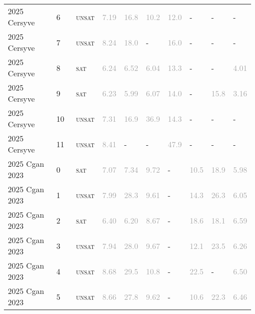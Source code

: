 \begin{center}
{\begin{longtable}{@{}llllllllll@{}}
2025 Cersyve & 6 & ~\textsc{unsat} & \textcolor{darkgray}{7.19} & \textcolor{darkgray}{16.8} & \textcolor{darkgray}{10.2} & \textcolor{darkgray}{12.0} & - & - & - \\
2025 Cersyve & 7 & ~\textsc{unsat} & \textcolor{darkgray}{8.24} & \textcolor{darkgray}{18.0} & - & \textcolor{darkgray}{16.0} & - & - & - \\
2025 Cersyve & 8 & ~\textsc{sat} & \textcolor{darkgray}{6.24} & \textcolor{darkgray}{6.52} & \textcolor{darkgray}{6.04} & \textcolor{darkgray}{13.3} & - & - & \textcolor{darkgray}{4.01} \\
2025 Cersyve & 9 & ~\textsc{sat} & \textcolor{darkgray}{6.23} & \textcolor{darkgray}{5.99} & \textcolor{darkgray}{6.07} & \textcolor{darkgray}{14.0} & - & \textcolor{darkgray}{15.8} & \textcolor{darkgray}{3.16} \\
2025 Cersyve & 10 & ~\textsc{unsat} & \textcolor{darkgray}{7.31} & \textcolor{darkgray}{16.9} & \textcolor{darkgray}{36.9} & \textcolor{darkgray}{14.3} & - & - & - \\
2025 Cersyve & 11 & ~\textsc{unsat} & \textcolor{darkgray}{8.41} & - & - & \textcolor{darkgray}{47.9} & - & - & - \\
\midrule
2025 Cgan 2023 & 0 & ~\textsc{sat} & \textcolor{darkgray}{7.07} & \textcolor{darkgray}{7.34} & \textcolor{darkgray}{9.72} & - & \textcolor{darkgray}{10.5} & \textcolor{darkgray}{18.9} & \textcolor{darkgray}{5.98} \\
2025 Cgan 2023 & 1 & ~\textsc{unsat} & \textcolor{darkgray}{7.99} & \textcolor{darkgray}{28.3} & \textcolor{darkgray}{9.61} & - & \textcolor{darkgray}{14.3} & \textcolor{darkgray}{26.3} & \textcolor{darkgray}{6.05} \\
2025 Cgan 2023 & 2 & ~\textsc{sat} & \textcolor{darkgray}{6.40} & \textcolor{darkgray}{6.20} & \textcolor{darkgray}{8.67} & - & \textcolor{darkgray}{18.6} & \textcolor{darkgray}{18.1} & \textcolor{darkgray}{6.59} \\
2025 Cgan 2023 & 3 & ~\textsc{unsat} & \textcolor{darkgray}{7.94} & \textcolor{darkgray}{28.0} & \textcolor{darkgray}{9.67} & - & \textcolor{darkgray}{12.1} & \textcolor{darkgray}{23.5} & \textcolor{darkgray}{6.26} \\
2025 Cgan 2023 & 4 & ~\textsc{unsat} & \textcolor{darkgray}{8.68} & \textcolor{darkgray}{29.5} & \textcolor{darkgray}{10.8} & - & \textcolor{darkgray}{22.5} & - & \textcolor{darkgray}{6.50} \\
2025 Cgan 2023 & 5 & ~\textsc{unsat} & \textcolor{darkgray}{8.66} & \textcolor{darkgray}{27.8} & \textcolor{darkgray}{9.62} & - & \textcolor{darkgray}{10.6} & \textcolor{darkgray}{22.3} & \textcolor{darkgray}{6.46} \\

\end{longtable}}
\end{center}
